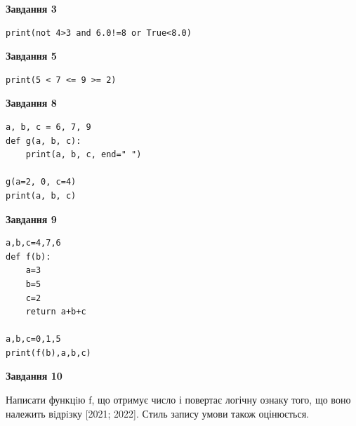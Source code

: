 \documentclass[12pt, ukrainian]{article}
\begin{document}
{\begin {large}
\begin{minipage}[t]{7.5cm}
\end{minipage}
\vline \hspace{6mm}
\begin{minipage}[t]{10.5cm}

\begin{center}
\textbf{Завдання 3}
\end{center}

\begin{verbatim}
print(not 4>3 and 6.0!=8 or True<8.0)
\end{verbatim}



\begin{center}
\textbf{Завдання 5}
\end{center}

\begin{verbatim}
print(5 < 7 <= 9 >= 2)
\end{verbatim}



\begin{center}
\textbf{Завдання 8}
\end{center}

\begin{verbatim}
a, b, c = 6, 7, 9
def g(a, b, c):
    print(a, b, c, end=" ")

g(a=2, 0, c=4)
print(a, b, c)
\end{verbatim}



\begin{center}
\textbf{Завдання 9}
\end{center}

\begin{verbatim}
a,b,c=4,7,6
def f(b):
    a=3
    b=5
    c=2
    return a+b+c

a,b,c=0,1,5
print(f(b),a,b,c)
\end{verbatim}



\begin{center}
\textbf{Завдання 10}
\end{center}

Написати функцiю f, що отримує число і повертає логічну ознаку того, що воно належить вiдрiзку [2021; 2022]. Стиль запису умови також оцінюється.\par

\end{minipage}

\end {large}}
\newpage
\end{document}
